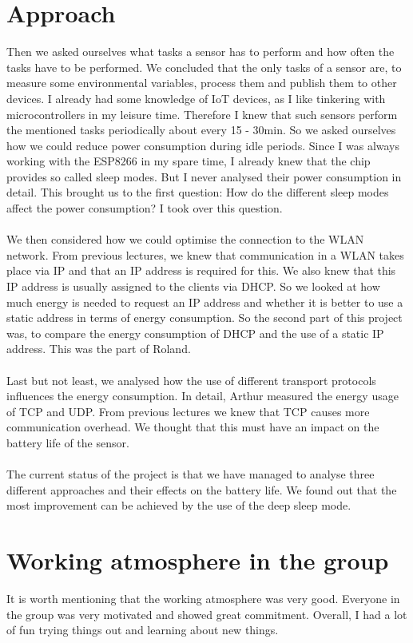 \section*{Approach}
Then we asked ourselves what tasks a sensor has to perform and how often the tasks have to be performed. We concluded that the only tasks of a sensor are, to measure some environmental variables, process them and publish them to other devices. I already had some knowledge of IoT devices, as I like tinkering with microcontrollers in my leisure time. Therefore I knew that such sensors perform the mentioned tasks periodically about every 15 - 30min.
So we asked ourselves how we could reduce power consumption during idle periods. 
Since I was always working with the ESP8266 in my spare time, I already knew that the chip provides so called sleep modes. But I never analysed their power consumption in detail.
This brought us to the first question: How do the different sleep modes affect the power consumption?
I took over this question.\\
\\
We then considered how we could optimise the connection to the WLAN network. From previous lectures, we knew that communication in a WLAN takes place via IP and that an IP address is required for this. We also knew that this IP address is usually assigned to the clients via DHCP.
So we looked at how much energy is needed to request an IP address and whether it is better to use a static address in terms of energy consumption.
So the second part of this project was, to compare the energy consumption of DHCP and the use of a static IP address.
This was the part of Roland.\\
\\
Last but not least, we analysed how the use of different transport protocols influences the energy consumption. In detail, Arthur measured the energy usage of TCP and UDP. From previous lectures we knew that TCP causes more communication overhead. We thought that this must have an impact on the battery life of the sensor. \\
\\
The current status of the project is that we have managed to analyse three different approaches and their effects on the battery life. We found out that the most improvement can be achieved by the use of the deep sleep mode.


\section*{Working atmosphere in the group}
It is worth mentioning that the working atmosphere was very good. Everyone in the group was very motivated and showed great commitment. Overall, I had a lot of fun trying things out and learning about new things. 


